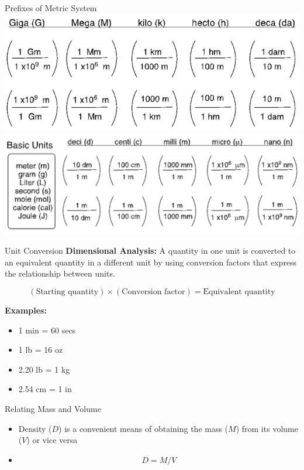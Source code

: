 \documentclass[11pt]{beamer}
\begin{document}
\begin{frame}{Prefixes of Metric System}
  \centering
  \includegraphics[scale=0.3]{metric_1}
  \includegraphics[scale=0.3]{metric_2}
\end{frame}

\begin{frame}{Unit Conversion}
  \textbf{Dimensional Analysis:} A quantity in one unit is converted
  to an equivalent quantity in a different unit by using conversion
  factors that express the relationship between units.

  \begin{equation}
    (\text{Starting quantity})\times (\text{Conversion factor})
    = \text{Equivalent quantity}
  \end{equation}

  \textbf{Examples:}
  \begin{itemize}
  \item 1 min = 60 secs
  \item 1 lb = 16 oz
  \item 2.20 lb = 1 kg
  \item 2.54 cm = 1 in
  \end{itemize}
\end{frame}

\begin{frame}{Relating Mass and Volume}
  \begin{itemize}
  \item Density ($D$) is a convenient means of obtaining the
    mass ($M$) from its volume ($V$) or vice versa
  \item[] \begin{equation}
    D = M/V
  \end{equation}
  \end{itemize}
\end{frame}
\end{document}
